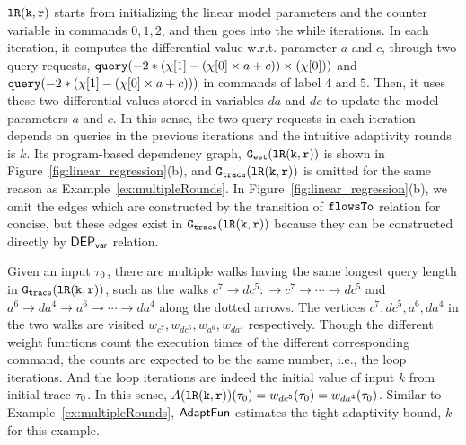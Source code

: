 $\mathtt{lR(k, r)}$ starts from initializing the linear model parameters and the counter variable in commands $0, 1, 2$,
and then goes into the while iterations.
In each iteration, it computes the differential value w.r.t. parameter
$a$ and $c$,
through two query requests, 
${\tt query}(-2 * (\chi[1] - (\chi[0]\times a + c)) \times (\chi[0]))$ and 
${\tt query}(-2 * (\chi[1] - (\chi[0]\times a + c)))$
in commands of label $4$ and $5$.
Then, it uses these two differential values stored in variables $da$ and $dc$
to update the model parameters $a$ and $c$.
In this sense, the two query requests in each iteration depends on queries in the previous iterations and the intuitive adaptivity rounds is $k$.
%
Its program-based dependency graph, $\mathtt{{G_{est}}}(\mathtt{lR(k, r)})$ is shown in Figure~\ref{fig:linear_regression}(b),
and $\mathtt{{G_{trace}}}(\mathtt{lR(k, r)})$ is omitted for the same reason as Example~\ref{ex:multipleRounds}.
In Figure~\ref{fig:linear_regression}(b), we omit the edges which are constructed by the transition of $\mathtt{flowsTo}$ relation
for concise, but these edges exist in $\mathtt{{G_{trace}}}(\mathtt{lR(k, r)})$  because they can be constructed directly by $\mathsf{DEP_{var}}$ relation.

Given an input $\mathtt{\tau}_0$, there are multiple walks having the same longest query length in 
$\mathtt{{G_{trace}}}(\mathtt{lR(k, r)})$,
such as the walks 
$c^7 \to dc^5 : \to c^7 \to \cdots \to dc^5$ and
$a^6 \to da^4  \to a^6 \to \cdots \to da^4 $ along the 
dotted arrows.
The vertices $c^7, dc^5, a^6, da^4$ in the two walks are visited $w_{c^7}, w_{dc^5}, w_{a^6}, w_{da^4}$ respectively.
Though the different weight functions count the execution times of the different corresponding command,
the counts are expected to be the same number, i.e., the loop iterations.
And the loop iterations are indeed the initial value of input $k$ from initial trace $\mathtt{\tau}_0$.
In this sense, $A(\mathtt{lR(k, r)})(\mathtt{\tau}_0) = w_{dc^5}(\mathtt{\tau}_0) = w_{da^4}(\mathtt{\tau}_0)$.
Similar to Example~\ref{ex:multipleRounds}, $\textsf{AdaptFun}$ estimates the tight adaptivity bound, $k$ for this example.

%